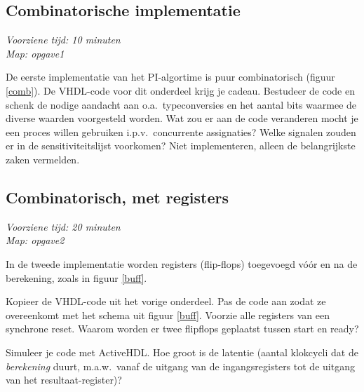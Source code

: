 \subsection{Combinatorische implementatie}
{\em Voorziene tijd: 10 minuten} \\
{\em Map: opgave1}

De eerste implementatie van het PI-algortime is puur combinatorisch
(figuur \ref{comb}).  De VHDL-code voor dit onderdeel krijg je
cadeau. Bestudeer de code en schenk de nodige aandacht aan o.a.\
typeconversies en het aantal bits waarmee de diverse waarden
voorgesteld worden.  Wat zou er aan de code veranderen mocht je een
proces willen gebruiken i.p.v.\ concurrente assignaties?  Welke
signalen zouden er in de sensitiviteitslijst voorkomen? Niet
implementeren, alleen de belangrijkste zaken vermelden.


\subsection{Combinatorisch, met registers}
{\em Voorziene tijd: 20 minuten} \\
{\em Map: opgave2}

In de tweede implementatie worden registers (flip-flops) toegevoegd
v\'o\'or en na de berekening, zoals in figuur \ref{buff}.


Kopieer de VHDL-code uit het vorige onderdeel. Pas de code aan zodat
ze overeenkomt met het schema uit figuur \ref{buff}. Voorzie alle
registers van een synchrone reset.  Waarom worden er twee flipflops
geplaatst tussen start en ready?

Simuleer je code met ActiveHDL. Hoe groot is de latentie (aantal
klokcycli dat de {\em berekening} duurt, m.a.w.\ vanaf de uitgang van
de ingangsregisters tot de uitgang van het resultaat-register)?

